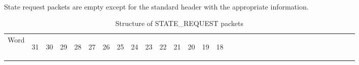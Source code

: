 \documentclass[11pt]{article}
\begin{document}
\paragraph{}
State request packets are empty except for the standard header with the appropriate information.
\newline
\begin{table}[h!]
    \centering
    \caption{Structure of STATE\_REQUEST packets}
    \label{tab:stateReqestDef}
    \begin{tabular}{|p{1cm}|m{0.04cm}|m{0.04cm}|m{0.04cm}|m{0.04cm}|m{0.04cm}|m{0.04cm}|m{0.04cm}|m{0.04cm}|m{0.04cm}|
        m{0.04cm}|m{0.04cm}|m{0.04cm}|m{0.04cm}|m{0.04cm}|m{0.04cm}|m{0.04cm}|m{0.04cm}|m{0.04cm}|m{0.04cm}|m{0.04cm}|
        m{0.04cm}|m{0.04cm}|m{0.04cm}|m{0.04cm}|m{0.04cm}|m{0.04cm}|m{0.04cm}|m{0.04cm}|m{0.04cm}|m{0.04cm}|m{0.04cm}|m{0.04cm}|}
        \hline
        Word & 
        \begin{sideways}31\end{sideways} &
        \begin{sideways}30\end{sideways} & 
        \begin{sideways}29\end{sideways} &
        \begin{sideways}28\end{sideways} &
        \begin{sideways}27\end{sideways} &
        \begin{sideways}26\end{sideways} &
        \begin{sideways}25\end{sideways} &
        \begin{sideways}24\end{sideways} &
        \begin{sideways}23\end{sideways} &
        \begin{sideways}22\end{sideways} &
        \begin{sideways}21\end{sideways} &
        \begin{sideways}20\end{sideways} &
        \begin{sideways}19\end{sideways} &
        \begin{sideways}18\end{sideways} &

\end{tabular}
\end{table}
\end{document}
